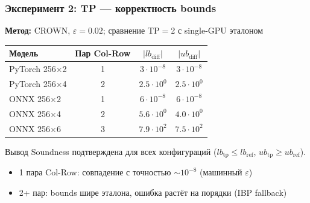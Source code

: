 \begin{frame}
\frametitle{Эксперимент 2: TP --- корректность bounds}

\textbf{Метод:} CROWN, $\varepsilon{=}0.02$; сравнение TP$=$2 с single-GPU эталоном

\vspace{0.2cm}

\begin{table}[h]
\centering
\scriptsize
\begin{tabular}{lccc}
\hline
\textbf{Модель} & \textbf{Пар Col-Row} & $|lb_{\text{diff}}|$ & $|ub_{\text{diff}}|$ \\
\hline
PyTorch 256$\times$2 & 1 & $3 \cdot 10^{-8}$ & $3 \cdot 10^{-8}$ \\
PyTorch 256$\times$4 & 2 & $2.5 \cdot 10^{0}$  & $2.5 \cdot 10^{0}$ \\
ONNX 256$\times$2    & 1 & $6 \cdot 10^{-8}$ & $6 \cdot 10^{-8}$ \\
ONNX 256$\times$4    & 2 & $5.6 \cdot 10^{0}$  & $4.0 \cdot 10^{0}$ \\
ONNX 256$\times$6    & 3 & $7.9 \cdot 10^{2}$  & $7.5 \cdot 10^{2}$ \\
\hline
\end{tabular}
\end{table}

\vspace{0.2cm}

\begin{alertblock}{Вывод}
Soundness подтверждена для всех конфигураций ($lb_{\text{tp}} \leq lb_{\text{ref}}$, $ub_{\text{tp}} \geq ub_{\text{ref}}$).
\begin{itemize}
    \item 1 пара Col-Row: совпадение с точностью $\sim 10^{-8}$ (машинный $\varepsilon$)
    \item 2+ пар: bounds шире эталона, ошибка растёт на порядки (IBP fallback)
\end{itemize}
\end{alertblock}

\end{frame}

